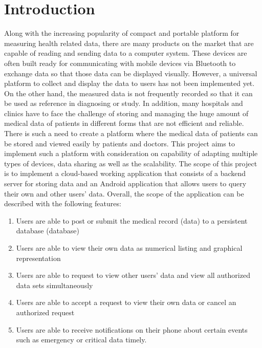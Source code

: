 \section{Introduction}
Along with the increasing popularity of compact and portable platform for measuring health related data, there are many
products on the market that are capable of reading and sending data to a computer system. These devices are often built
ready for communicating with mobile devices via Bluetooth to exchange data so that those data can be displayed visually.
However, a universal platform to collect and display the data to users has not been implemented yet. On the other hand,
the measured data is not frequently recorded so that it can be used as reference in diagnosing or study. In addition,
many hospitals and clinics have to face the challenge of storing and managing the huge amount of medical data of patients
in different forms that are not efficient and reliable. There is such a need to create a platform where the medical data
of patients can be stored and viewed easily by patients and doctors. This project aims to implement such a platform with
consideration on capability of adapting multiple types of devices, data sharing as well as the scalability.  The scope
of this project is to implement a cloud-based working application that consists of a backend server for storing data
and an Android application that allows users to query their own and other users' data. Overall, the scope of the
application can be described with the following features:
\begin{enumerate}
    \item Users are able to post or submit the medical record (data) to a persistent database (database)
    \item Users are able to view their own data as numerical listing and graphical representation
    \item Users are able to request to view other users' data and view all authorized data sets simultaneously
    \item Users are able to accept a request to view their own data or cancel an authorized request
    \item Users are able to receive notifications on their phone about certain events such as emergency or critical
        data timely.
\end{enumerate}


